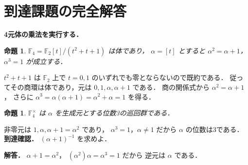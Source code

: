 \documentclass[a5paper,10pt,onecolumn]{jsarticle}
\makeatletter
\theoremstyle{mathnotetheorem}
\newtheorem{proposition}[theorem]{命題}
\renewcommand{\proofname}{証明}
\renewenvironment{proof}[1][\proofname]{%
  \par\pushQED{\qed}\normalfont\topsep4\p@\@plus2\p@\relax
  \trivlist\item[\hskip\labelsep\bfseries #1]\ignorespaces
}{\popQED\endtrivlist\@endpefalse}
\makeatother
\begin{document}
\section{到達課題の完全解答}
\noindent\textbf{4元体の乗法を実行する．}
\begin{proposition}
$\mathbb F_4=\mathbb F_2[t]/(t^2+t+1)$ は体であり，
$\alpha=[t]$ とすると $\alpha^2=\alpha+1$，
$\alpha^3=1$ が成立する．
\end{proposition}
\begin{proof}
$t^2+t+1$ は $\mathbb F_2$ 上で
$t=0,1$ のいずれでも零とならないので既約である．
従ってその商環は体であり，元は
$0,1,\alpha,\alpha+1$ である．
商の関係式から $\alpha^2=\alpha+1$，
さらに
$\alpha^3=\alpha(\alpha+1)
=\alpha^2+\alpha=1$ を得る．
\end{proof}
\begin{proposition}
$\mathbb F_4^\times$ は $\alpha$ を生成元とする位数3の巡回群である．
\end{proposition}
\begin{proof}
非零元は $1,\alpha,\alpha+1=\alpha^2$ であり，
$\alpha^3=1$，$\alpha\ne1$ だから $\alpha$ の位数は3である．
\end{proof}
\noindent\textbf{到達確認．}
$(\alpha+1)^{-1}$ を求めよ．
\par\noindent\textbf{解答．}
$\alpha+1=\alpha^2$，
$(\alpha^2)\alpha=\alpha^3=1$ だから
逆元は $\alpha$ である．
\end{document}
